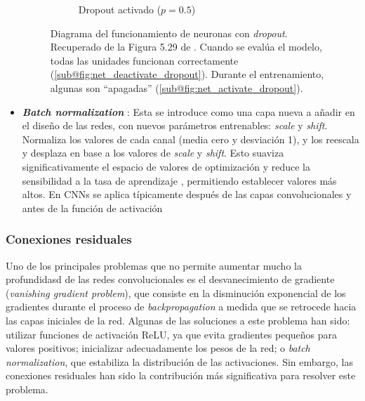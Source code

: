 \begin{itemize}
\begin{figure}[h]
\begin{subfigure}[b]{0.45\textwidth}
            \caption{Dropout activado ($p=0.5$)}
            \label{fig:net_activate_dropout}
        \end{subfigure}

        \caption{
            Diagrama del funcionamiento de neuronas con \textit{dropout}.
            Recuperado de la Figura 5.29 de \cite{szeliski2010}.
            Cuando se evalúa el modelo, todas las unidades funcionan correctamente (\ref{sub@fig:net_deactivate_dropout}). 
            Durante el entrenamiento, algunas son ``apagadas'' (\ref{sub@fig:net_activate_dropout}). 
        }
        \label{fig:net_with_dropout}
    \end{figure}
    
    \item \textbf{\textit{Batch normalization}} \cite{ioffe2015}: Esta se introduce como una capa nueva a 
    añadir en el diseño de las redes, con nuevos parámetros entrenables: \textit{scale} y \textit{shift}. 
    Normaliza los valores de cada canal (media cero y desviación 1), y los reescala y desplaza en base a los
    valores de \textit{scale} y \textit{shift}. 
    Esto suaviza significativamente el espacio de valores de optimización \cite{santurkar2019} y reduce la 
    sensibilidad a la tasa de aprendizaje \cite{arora2018}, permitiendo establecer valores más altos.
    En CNNs se aplica típicamente después de las capas convolucionales y antes de la función de activación
    
\end{itemize}


\subsubsection{Conexiones residuales}

Uno de los principales problemas que no permite aumentar mucho la profundidasd de las redes convolucionales 
es el desvanecimiento de gradiente (\textit{vanishing gradient problem}), que consiste en la disminución 
exponencial de los gradientes durante el proceso de \textit{backpropagation} a medida que se retrocede hacia 
las capas iniciales de la red. Algunas de las soluciones a este problema han sido: utilizar funciones de 
activación ReLU, ya que evita gradientes pequeños para valores positivos; inicializar adecuadamente los pesos
de la red; o \textit{batch normalization}, que estabiliza la distribución de las activaciones. Sin embargo,
las conexiones residuales han sido la contribución más significativa para resolver este problema.

